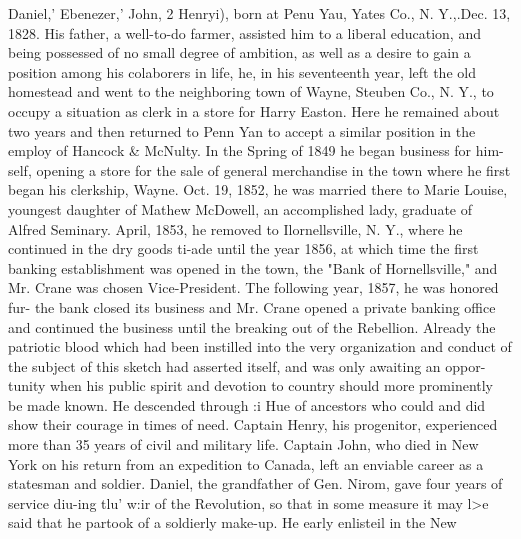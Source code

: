 \documentclass{book}
\begin{document}
Daniel,' Ebenezer,' John, 2 Henryi), born at Penu Yau, Yates 
Co., N. Y.,.Dec. 13, 1828. His father, a well-to-do farmer, 
assisted him to a liberal education, and being possessed of no 
small degree of ambition, as well as a desire to gain a position 
among his colaborers in life, he, in his seventeenth year, left the old 
homestead and went to the neighboring town of Wayne, Steuben 
Co., N. Y., to occupy a situation as clerk in a store for Harry 
Easton. Here he remained about two years and then returned to 
Penn Yan to accept a similar position in the employ of Hancock 
\& McNulty. In the Spring of 1849 he began business for him- 
self, opening a store for the sale of general merchandise in the 
town where he first began his clerkship, Wayne. Oct. 19, 1852, 
he was married there to Marie Louise, youngest daughter of 
Mathew McDowell, an accomplished lady, graduate of Alfred 
Seminary. April, 1853, he removed to Ilornellsville, N. Y., 
where he continued in the dry goods ti-ade until the year 1856, at 
which time the first banking establishment was opened in the 
town, the "Bank of Hornellsville," and Mr. Crane was chosen 
Vice-President. The following year, 1857, he was honored fur- 
the bank closed its business and Mr. Crane opened a private 
banking office and continued the business until the breaking out 
of the Rebellion. Already the patriotic blood which had been 
instilled into the very organization and conduct of the subject 
of this sketch had asserted itself, and was only awaiting an oppor- 
tunity when his public spirit and devotion to country should more 
prominently be made known. He descended through :i Hue of 
ancestors who could and did show their courage in times of need. 
Captain Henry, his progenitor, experienced more than 35 years 
of civil and military life. Captain John, who died in New York 
on his return from an expedition to Canada, left an enviable 
career as a statesman and soldier. Daniel, the grandfather of 
Gen. Nirom, gave four years of service diu-ing tlu' w:ir of the 
Revolution, so that in some measure it may l>e said that he 
partook of a soldierly make-up. He early enlisteil in the New 
\end{document}
